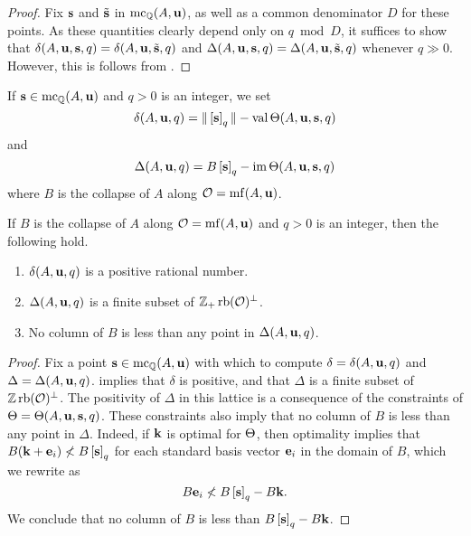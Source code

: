 \documentclass[11pt]{amsart}
\begin{document}
\begin{proof}
Fix $\mathbf{s}$ and $\tilde{\mathbf{s}}$ in $\operatorname{mc}_{\mathbb{Q}}(A, \mathbf{u})$, as well as a common denominator $D$ for these points.  As these quantities clearly depend only on $q \bmod D$, it suffices to show that $\delta(A, \mathbf{u}, \mathbf{s}, q) = \delta(A, \mathbf{u}, \tilde{\mathbf{s}}, q)$  and $ \Delta(A, \mathbf{u}, \mathbf{s}, q) = \Delta(A, \mathbf{u}, \tilde{\mathbf{s}}, q)$ whenever $q \gg 0$.  However, this is follows from .
\end{proof}

\begin{definition}  
\label{independence: D}  
If $\mathbf{s} \in \operatorname{mc}_{\mathbb{Q}}(A, \mathbf{u})$ and $q>0$ is an integer, we set \[ \delta(A, \mathbf{u}, q) = \| \left[ \mathbf{s} \right]_q \|  - \operatorname{val} \Theta(A, \mathbf{u}, \mathbf{s}, q)\] and 
\[\Delta(A, \mathbf{u}, q) = B \left[ \mathbf{s} \right]_q - \operatorname{im}  \Theta( A, \mathbf{u}, \mathbf{s}, q)  \]
where $B$ is the collapse of $A$ along $\mathcal{O} = \operatorname{mf}(A, \mathbf{u})$. 
\end{definition}


\begin{lemma}  
\label{independence: L}  
If $B$ is the collapse of $A$ along $\mathcal{O} = \operatorname{mf}(A, \mathbf{u})$ and $q>0$ is an integer, then the following hold.

\begin{enumerate}
\item $\delta(A, \mathbf{u}, q)$  is a positive rational number.
\item $\Delta(A, \mathbf{u}, q)$ is a finite subset of $\mathbb{Z}_+\operatorname{rb}(\mathcal{O})^{\perp}$.
\item No column of $B$ is less than any point in $\Delta(A, \mathbf{u}, q)$.
\end{enumerate}
\end{lemma}

\begin{proof} 
Fix a point $\mathbf{s} \in \operatorname{mc}_{\mathbb{Q}}(A, \mathbf{u})$ with which to compute $\delta = \delta(A, \mathbf{u}, q)$ and $\Delta = \Delta(A, \mathbf{u}, q)$.   implies that $\delta$ is positive, and  that $\Delta$ is a finite subset of $\mathbb{Z} \operatorname{rb}(\mathcal{O})^{\perp}$.   The positivity of $\Delta$ in this lattice is a consequence of the constraints of $\Theta = \Theta(A, \mathbf{u}, \mathbf{s}, q)$.  These constraints also imply that no column of $B$ is less than any point in $\Delta$.  Indeed, if $\mathbf{k}$ is optimal for $\Theta$, then optimality implies that  $B( \mathbf{k} + \mathbf{e}_i) \not < B \left[ \mathbf{s} \right]_q$ for each standard basis vector $\mathbf{e}_i$ in the domain of $B$, which we rewrite as  \[ B \mathbf{e}_i \not < B \left[ \mathbf{s} \right]_q - B \mathbf{k}.\] 
We conclude that no column of $B$ is less than $B\left[ \mathbf{s} \right]_q - B\mathbf{k}$.
\end{proof}
\end{document}

